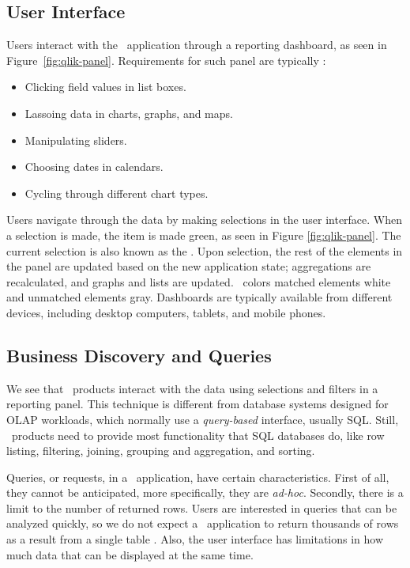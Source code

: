 \subsection{User Interface}
\label{sub:User Interface}
Users interact with the \bd~application through a reporting dashboard, as seen in Figure~\ref{fig:qlik-panel}. Requirements for such panel are typically \cite{Qlik2014-vd}:
\begin{itemize}
  \item Clicking field values in list boxes.
  \item Lassoing data in charts, graphs, and maps.
  \item Manipulating sliders.
  \item Choosing dates in calendars.
  \item Cycling through different chart types.
\end{itemize}

Users navigate through the data by making selections in the user interface. When a selection is made, the item is made green, as seen in Figure \ref{fig:qlik-panel}. The current selection is also known as the . Upon selection, the rest of the elements in the panel are updated based on the new application state; aggregations are recalculated, and graphs and lists are updated. \qlikview~colors matched elements white and unmatched elements gray. Dashboards are typically available from different devices, including desktop computers, tablets, and mobile phones.

\subsection{Business Discovery and Queries}
\label{sub:Business Discovery and QueriesL}

We see that \bd~products interact with the data using selections and filters in a reporting panel. This technique is different from database systems designed for OLAP workloads, which normally use a \textit{query-based} interface, usually SQL. Still, \bd~products need to provide most functionality that SQL databases do, like row listing, filtering, joining, grouping and aggregation, and sorting.

Queries, or requests, in a \bd~application, have certain characteristics. First of all, they cannot be anticipated, more specifically, they are \textit{ad-hoc}. Secondly, there is a limit to the number of returned rows. Users are interested in queries that can be analyzed quickly, so we do not expect a \bd~application to return thousands of rows as a result from a single table \cite{Ferrari2012-hm}. Also, the user interface has limitations in how much data that can be displayed at the same time. 

